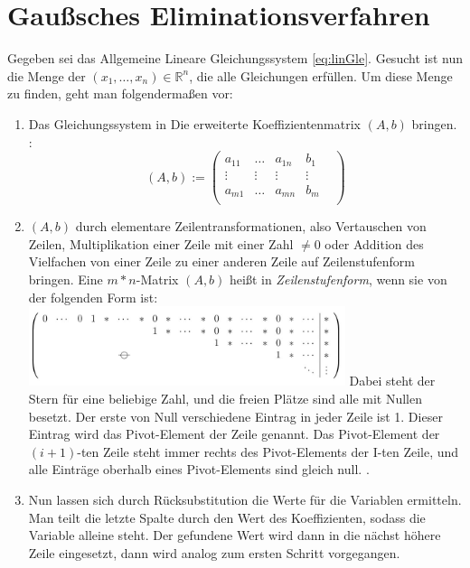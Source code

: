\documentclass[a4paper, 12pt]{report}
\begin{document}
\section{Gaußsches Eliminationsverfahren} \label{2.2}
Gegeben sei das Allgemeine Lineare Gleichungssystem \ref{eq:linGle}.
Gesucht ist nun die Menge der $ (x_1, \hdots ,x_n ) \in \mathbb{R}^n $, die alle Gleichungen erfüllen.
Um diese Menge zu finden, geht man folgendermaßen vor:
\begin{enumerate}
    \item Das Gleichungssystem in Die erweiterte Koeffizientenmatrix $ (A, b) $ bringen. \cite{2}:
        \begin{equation}
            (A, b):=
            \begin{pmatrix}
                a_{11} & \hdots &  a_{1n} &  b_1  \\
                \vdots & \vdots &  \vdots & \vdots &  \\
                a_{m1} &  \hdots &  a_{mn} &  b_m \\
            \end{pmatrix}
        \end{equation}
    \item $(A, b)$ durch elementare Zeilentransformationen, also Vertauschen von Zeilen,
        Multiplikation einer Zeile mit einer Zahl $\neq 0 $ oder Addition des Vielfachen von einer Zeile zu einer
        anderen Zeile auf Zeilenstufenform bringen.
        Eine $ m * n $-Matrix $(A,b)$ heißt in \textit{Zeilenstufenform},
        wenn sie von der folgenden Form ist: \newline \newline
        \includegraphics[width=350px]{"./Zeilenstufenform.jpeg"} \newline \newline
        Dabei steht der Stern für eine beliebige Zahl, und die freien Plätze sind alle mit Nullen besetzt.
        Der erste von Null verschiedene Eintrag in jeder Zeile ist 1. Dieser Eintrag wird das Pivot-Element der Zeile genannt.
        Das Pivot-Element der $(i + 1)$-ten Zeile steht immer rechts des Pivot-Elements der I-ten Zeile, und alle Einträge
        oberhalb eines Pivot-Elements sind gleich null. \cite{5}.
    \item Nun lassen sich durch Rücksubstitution die Werte für die Variablen ermitteln.
          Man teilt die letzte Spalte durch den Wert des Koeffizienten, sodass die Variable alleine steht.
          Der gefundene Wert wird dann in die nächst höhere Zeile eingesetzt, dann wird analog zum ersten Schritt vorgegangen.
\end{enumerate}
\end{document}
